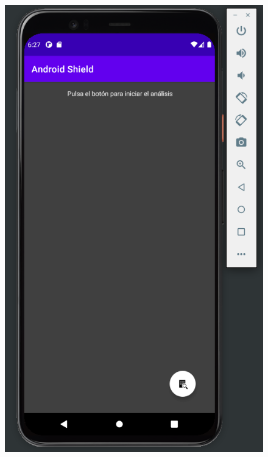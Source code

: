 \begin{figure}[H]
\centering
\begin{minipage}{.5\textwidth}
	\centering
	\includegraphics[scale=0.3]{img/emulator.png}
	\label{fig:test1}
\end{minipage}%
\begin{minipage}{.5\textwidth}
	\centering

\end{minipage}
\end{figure}
